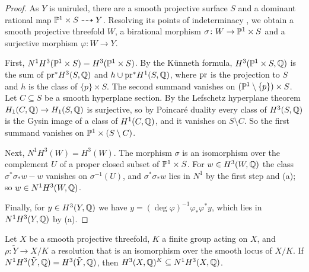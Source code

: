 \begin{proof}
As $Y$ is uniruled, there are a smooth projective surface $S$ and a dominant
rational map $\mathbb{P}^{1}\times S\dashrightarrow Y$. Resolving its points of
indeterminacy \cite{Hir64}, we obtain a smooth projective threefold $W$, a
birational morphism $\sigma\colon W\to\mathbb{P}^{1}\times S$ and a surjective
morphism $\varphi\colon W\to Y$.

First, $N^{1}H^{3}(\mathbb{P}^{1}\times S)=H^{3}(\mathbb{P}^{1}\times S)$. By the
K\"unneth formula, $H^{3}(\mathbb{P}^{1}\times S,\mathbb{Q})$ is the sum of
$\mathrm{pr}^{*}H^{3}(S,\mathbb{Q})$ and $h\cup\mathrm{pr}^{*}H^{1}(S,\mathbb{Q})$, where $\mathrm{pr}$ is the
projection to $S$ and $h$ is the class of $\{p\}\times S$. The second
summand vanishes on $(\mathbb{P}^{1}\setminus\{p\})\times S$. Let $C\subseteq S$ be
a smooth hyperplane section. By the Lefschetz hyperplane theorem $H_{1}(C,
\mathbb{Q})\to H_{1}(S,\mathbb{Q})$ is surjective, so by Poincar\'e duality every class of
$H^{3}(S,\mathbb{Q})$ is the Gysin image of a class of $H^{1}(C,\mathbb{Q})$, and it
vanishes on $S\setminus C$. So the first summand vanishes on $\mathbb{P}^{1}\times
(S\setminus C)$.

Next, $N^{1}H^{3}(W)=H^{3}(W)$. The morphism $\sigma$ is an isomorphism over
the complement $U$ of a proper closed subset of $\mathbb{P}^{1}\times S$. For
$w\in H^{3}(W,\mathbb{Q})$ the class $\sigma^{*}\sigma_{*}w-w$ vanishes on
$\sigma^{-1}(U)$, and $\sigma^{*}\sigma_{*}w$ lies in $N^{1}$ by the first
step and (a); so $w\in N^{1}H^{3}(W,\mathbb{Q})$.

Finally, for $y\in H^{3}(Y,\mathbb{Q})$ we have $y=(\deg\varphi)^{-1}\varphi_{*}
\varphi^{*}y$, which lies in $N^{1}H^{3}(Y,\mathbb{Q})$ by (a).
\end{proof}

\begin{lemma}\label{lem:quotientN1}
Let $X$ be a smooth projective threefold, $K$ a finite group acting on $X$,
and $\rho\colon\tilde Y\to X/K$ a resolution that is an isomorphism over the
smooth locus of $X/K$. If $N^{1}H^{3}(\tilde Y,\mathbb{Q})=H^{3}(\tilde Y,\mathbb{Q})$,
then $H^{3}(X,\mathbb{Q})^{K}\subseteq N^{1}H^{3}(X,\mathbb{Q})$.
\end{lemma}

